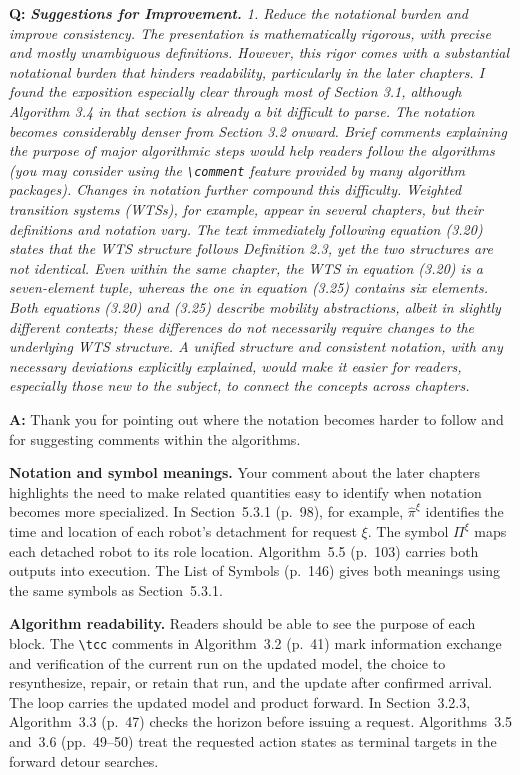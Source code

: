 \documentclass[11pt]{article}
\begin{document}
\begin{shaded*}
\noindent\textbf{Q:} \emph{\textbf{Suggestions for Improvement.} 1. Reduce the notational
burden and improve
consistency. The presentation is mathematically rigorous, with precise and mostly
unambiguous definitions. However, this rigor comes with a substantial notational burden
that hinders readability, particularly in the later chapters. I found the exposition
especially clear through most of Section 3.1, although Algorithm 3.4 in that section is
already a bit difficult to parse. The notation becomes considerably denser from Section
3.2 onward. Brief comments explaining the purpose of major algorithmic steps would help
readers follow the algorithms (you may consider using the \texttt{\textbackslash comment}
feature provided by many algorithm packages). Changes in notation further compound this
difficulty. Weighted transition systems (WTSs), for example, appear in several chapters,
but their definitions and notation vary. The text immediately following equation (3.20)
states that the WTS structure follows Definition 2.3, yet the two structures are not
identical. Even within the same chapter, the WTS in equation (3.20) is a seven-element
tuple, whereas the one in equation (3.25) contains six elements. Both equations (3.20) and
(3.25) describe mobility abstractions, albeit in slightly different contexts; these
differences do not necessarily require changes to the underlying WTS structure. A unified
structure and consistent notation, with any necessary deviations explicitly explained,
would make it easier for readers, especially those new to the subject, to connect the
concepts across chapters.}
\end{shaded*}
\noindent\textbf{A:} Thank you for pointing out where the notation becomes harder
to follow and for suggesting comments within the algorithms.

\textbf{Notation and symbol meanings.} Your comment about the later chapters
highlights the need to make related quantities easy to identify when notation
becomes more specialized. In Section~5.3.1 (p.~98), for example,
$\widehat{\pi}^{\xi}$ identifies the time and location of each robot's
detachment for request $\xi$. The symbol $\Pi^{\xi}$ maps each detached
robot to its role location. Algorithm~5.5 (p.~103) carries both outputs into
execution. The List of Symbols (p.~146) gives both meanings using the same
symbols as Section~5.3.1.

\textbf{Algorithm readability.} Readers should be able to see
the purpose of each block. The \texttt{\textbackslash tcc} comments in
Algorithm~3.2 (p.~41) mark information exchange and verification of the
current run on the updated model, the choice to resynthesize, repair, or
retain that run, and the update after confirmed arrival. The loop carries
the updated model and product forward. In Section~3.2.3, Algorithm~3.3
(p.~47) checks the horizon before issuing a request. Algorithms~3.5 and~3.6
(pp.~49--50) treat the requested action states as terminal targets in the
forward detour searches.
\end{document}
